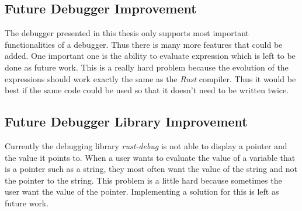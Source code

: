 \subsection{Future Debugger Improvement}
The debugger presented in this thesis only supports most important functionalities of a debugger.
Thus there is many more features that could be added.
One important one is the ability to evaluate expression which is left to be done as future work.
This is a really hard problem because the evolution of the expressions should work exactly the same as the \emph{Rust} compiler.
Thus it would be best if the same code could be used so that it doesn't need to be written twice.


\subsection{Future Debugger Library Improvement}
Currently the debugging library \emph{rust-debug} is not able to display a pointer and the value it points to.
When a user wants to evaluate the value of a variable that is a pointer such as a string, they most often want the value of the string and not the pointer to the string.
This problem is a little hard because sometimes the user want the value of the pointer.
Implementing a solution for this is left as future work.


